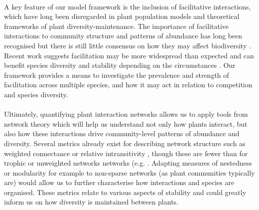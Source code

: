 \documentclass[a4,12pt]{article}
\begin{document}
        \paragraph{}
        A key feature of our model framework is the inclusion of facilitative interactions, which have long been disregarded in plant population models and theoretical frameworks of plant diversity-maintenance. The importance of facilitative interactions to community structure and patterns of abundance has long been recognised \citep{Callaway1997a} but there is still little consensus on how they may affect biodiversity \citep{Bruno2003}. Recent work suggests facilitation may be more widespread than expected \citep{Gross2015, Picoche2020} and can  benefit species diversity and stability depending on the circumstances \citep{Coyte2015, Brooker2008}. Our framework provides a means to investigate the prevalence and strength of facilitation across multiple species, and how it may act in relation to competition and species diversity.  
        
        \paragraph{}
        Ultimately, quantifying plant interaction networks allows us to apply tools from network theory which will help us understand not only how plants interact, but also how these interactions drive community-level patterns of abundance and diversity. Several metrics already exist for describing network structure such as weighted connectance \citep{Ulanowicz1991} or relative intransitivity \citep{Laird2006a}, though these are fewer than for trophic or unweighted networks networks (e.g. \citet{Bersier2002, Delmas2019}. Adapting measures of nestedness or modularity for example to non-sparse networks (as plant communities typically are) would allow us to further characterise how interactions and species are organised. These metrics relate to various aspects of stability and could greatly inform us on how diversity is maintained between plants. 

\end{document}
